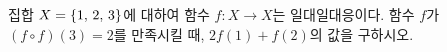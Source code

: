 \hspace*{2mm}\begin{minipage}[t]{\dimexpr\linewidth-2mm\relax}\vspace{0pt}
집합 $X=\{1,\mkern3mu 2,\mkern3mu 3\}$에 대하여 함수 $f:X\longrightarrow X$는 일대일대응이다. 함수 $f$가 $(f\circ f)(3)=2$를 만족시킬 때, $2f(1)+f(2)$의 값을 구하시오.\end{minipage}
